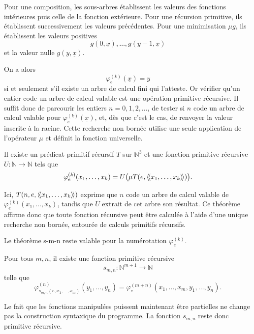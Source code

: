 Pour une composition, les sous-arbres établissent les valeurs des
fonctions intérieures puis celle de la fonction extérieure.  Pour une
récursion primitive, ils établissent successivement les valeurs
précédentes.  Pour une minimisation $\mu g$, ils établissent les
valeurs positives
\[
g(0,\underline{x}),\ldots,g(y-1,\underline{x})
\]
et la valeur nulle $g(y,\underline{x})$.

On a alors
\[
\varphi_e^{(k)}(\underline{x})=y
\]
si et seulement s'il existe un arbre de calcul fini qui l'atteste.
Or vérifier qu'un entier code un arbre de calcul valable est une
opération primitive récursive.  Il suffit donc de parcourir les
entiers $n=0,1,2,\ldots$, de tester si $n$ code un arbre de calcul
valable pour $\varphi_e^{(k)}(\underline{x})$, et, dès que c'est le
cas, de renvoyer la valeur inscrite à la racine.  Cette recherche non
bornée utilise une seule application de l'opérateur $\mu$ et définit
la fonction universelle.

\begin{thm}
\label{normal-form-theorem}
Il existe un prédicat primitif récursif $T$ sur $\mathbb{N}^3$ et une
fonction primitive récursive $U\colon\mathbb{N}\to\mathbb{N}$ tels que
\[
\varphi_e^{(k)}(x_1,\ldots,x_k)
 =
U\bigl(\mu T(e,\mathopen{\langle\!\langle} x_1,\ldots,x_k\mathclose{\rangle\!\rangle})\bigr).
\]
\end{thm}

Ici, $T(n,e,\mathopen{\langle\!\langle} x_1,\ldots,x_k\mathclose{\rangle\!\rangle})$ exprime que $n$
code un arbre de calcul valable de
$\varphi_e^{(k)}(x_1,\ldots,x_k)$, tandis que $U$ extrait de cet arbre
son résultat.  Ce théorème affirme donc que toute fonction récursive
peut être calculée à l'aide d'une unique recherche non bornée, entourée
de calculs primitifs récursifs.

\thingy Le théorème s-m-n reste valable pour la numérotation
$\varphi_e^{(k)}$.

\begin{thm}[Théorème s-m-n]\label{smn-recursive}
Pour tous $m,n$, il existe une fonction primitive récursive
\[
s_{m,n}\colon\mathbb{N}^{m+1}\to\mathbb{N}
\]
telle que
\[
\varphi^{(n)}_{s_{m,n}(e,x_1,\ldots,x_m)}
       (y_1,\ldots,y_n)
 =
\varphi^{(m+n)}_e
       (x_1,\ldots,x_m,y_1,\ldots,y_n).
\]
\end{thm}

Le fait que les fonctions manipulées puissent maintenant être
partielles ne change pas la construction syntaxique du programme.
La fonction $s_{m,n}$ reste donc primitive récursive.

